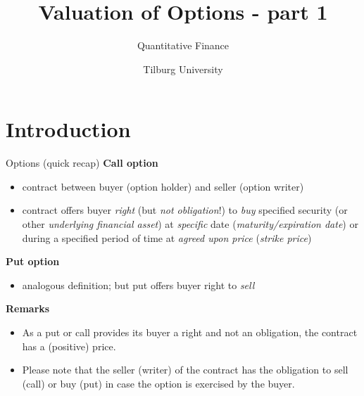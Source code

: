 \documentclass[pdf, handout]{beamer}
\title{Valuation of Options - part 1}
\subtitle{Quantitative Finance}
\author{Tilburg University}
\institute{Ramon van den Akker}
\date{}
\begin{document}
\begin{frame}
\titlepage
\end{frame}

\section{Introduction}

\begin{frame}{Options (quick recap)}
\textbf{Call option} 
\begin{itemize}
\item contract between buyer (option holder) and seller (option writer)
\item contract offers buyer \emph{right} (but \emph{not obligation}!) to \emph{buy}  specified security (or other \emph{underlying financial asset})  at \emph{specific} date (\emph{maturity/expiration date}) or during a specified period of time at  \emph{agreed upon price} (\emph{strike price})
\end{itemize}
\textbf{Put option} 
\begin{itemize}
\item analogous definition; but put offers buyer right to \emph{sell}
\end{itemize}
\textbf{Remarks}
\begin{itemize}
\item As a put or call provides its buyer a right and not an obligation, the contract has a (positive) price.
\item Please note that the seller (writer) of the contract has the obligation to sell (call) or buy (put) in case the option is exercised by the buyer.
\end{itemize}
\end{frame}
\end{document}
